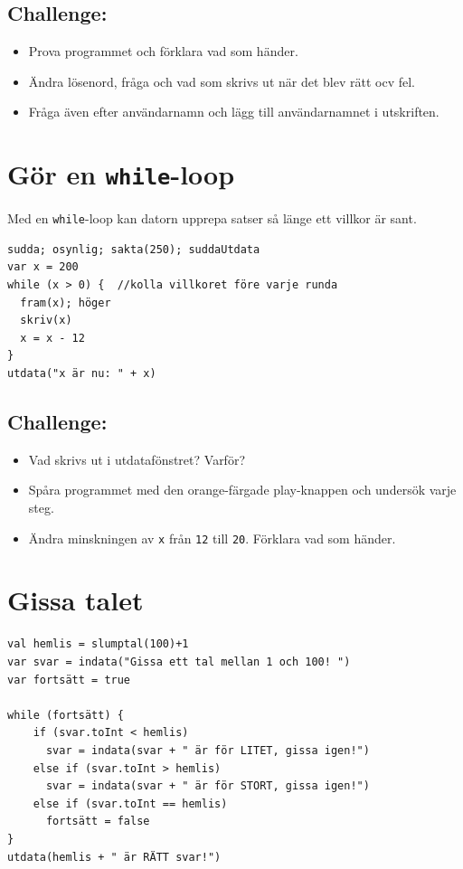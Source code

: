 \section*{\color{BrickRed}Challenge:}


\begin{itemize}

\item {Prova programmet och förklara vad som händer.}
\item {Ändra lösenord, fråga och vad som skrivs ut när det blev rätt ocv fel.}
\item {Fråga även efter användarnamn och lägg till användarnamnet i utskriften.}

\end{itemize}


\chapter{Gör en \lstinline{while}-loop}Med en \lstinline{while}-loop kan datorn upprepa satser så länge ett villkor är sant.

\begin{lstlisting}[basicstyle={\ttfamily\fontsize{22}{27}\selectfont},numbers=none]
sudda; osynlig; sakta(250); suddaUtdata
var x = 200
while (x > 0) {  //kolla villkoret före varje runda 
  fram(x); höger
  skriv(x) 
  x = x - 12
}
utdata("x är nu: " + x)
\end{lstlisting}
        
\section*{\color{BrickRed}Challenge:}


\begin{itemize}

\item {Vad skrivs ut i utdatafönstret? Varför?}
\item {Spåra programmet med den orange-färgade play-knappen och undersök varje steg.}
\item {Ändra minskningen av \lstinline{x} från \lstinline{12} till \lstinline{20}. Förklara vad som händer.}

\end{itemize}


\chapter{Gissa talet}
\begin{lstlisting}[basicstyle={\ttfamily\fontsize{16}{19}\selectfont},numbers=none]
val hemlis = slumptal(100)+1
var svar = indata("Gissa ett tal mellan 1 och 100! ")
var fortsätt = true

while (fortsätt) {
    if (svar.toInt < hemlis)
      svar = indata(svar + " är för LITET, gissa igen!")
    else if (svar.toInt > hemlis)
      svar = indata(svar + " är för STORT, gissa igen!")
    else if (svar.toInt == hemlis)
      fortsätt = false
}
utdata(hemlis + " är RÄTT svar!")
\end{lstlisting}
        
